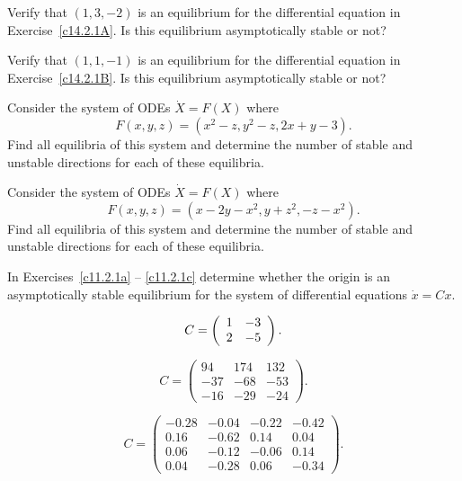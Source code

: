 \begin{exercise} \label{c14.2.1C}
Verify that $(1,3,-2)$ is an equilibrium for the differential equation in 
Exercise~\ref{c14.2.1A}.  Is this equilibrium asymptotically stable or not?
\end{exercise}

\begin{exercise} \label{c14.2.1D}
Verify that $(1,1,-1)$ is an equilibrium for the differential equation in 
Exercise~\ref{c14.2.1B}.  Is this equilibrium asymptotically stable or not?
\end{exercise}

\begin{exercise} \label{c14.2.1E}
Consider the system of ODEs $\dot{X}=F(X)$ where
\[
F(x,y,z) = (x^2 - z, y^2 - z, 2x + y - 3).
\]
Find all equilibria of this system and determine the number of stable and 
unstable directions for each of these equilibria.
\end{exercise}

\begin{exercise} \label{c14.2.1F}
Consider the system of ODEs $\dot{X}=F(X)$ where
\[
F(x,y,z) = (x - 2y - x^2, y + z^2, -z - x^2).
\]
Find all equilibria of this system and determine the number of stable and 
unstable directions for each of these equilibria.
\end{exercise}

\CEXER

\noindent In Exercises~\ref{c11.2.1a} -- \ref{c11.2.1c} determine whether 
the origin is an asymptotically stable equilibrium for the system of 
differential equations $\dot{x}=Cx$.
\begin{exercise} \label{c11.2.1a}
\[
C=\left(\begin{array}{rr} 1 & -3\\ 2 &-5\end{array}\right).
\]
\end{exercise}
\begin{exercise} \label{c11.2.1b}
\begin{equation*}
C=\left(\begin{array}{rrr} 
94 & 174 & 132 \\ 
-37 & -68 & -53 \\
-16 & -29 & -24 \end{array}\right).
\end{equation*}
\end{exercise}
\begin{exercise} \label{c11.2.1c}
\begin{equation*}
C=\left(\begin{array}{rrrr} 
-0.28 & -0.04 & -0.22 & -0.42 \\ 
0.16 & -0.62 & 0.14 & 0.04 \\ 
0.06 & -0.12 & -0.06 & 0.14 \\ 
0.04 & -0.28 & 0.06 & -0.34 \end{array}\right).
\end{equation*}
\end{exercise}

